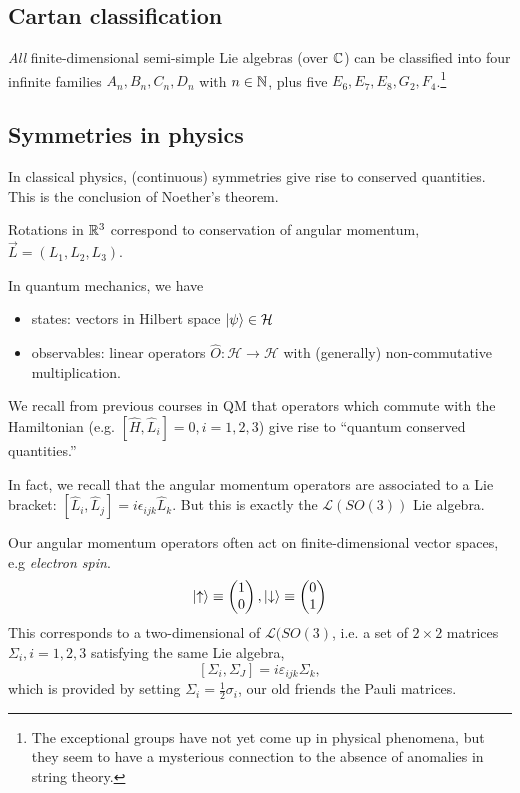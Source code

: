 \subsection*{Cartan classification}
\emph{All} finite-dimensional semi-simple Lie algebras (over $\mathbb{C}$) can be classified into four infinite families $A_n, B_n, C_n,D_n$ with $n\in \mathbb{N}$, plus five  $E_6,E_7,E_8,G_2,F_4$.\footnote{The exceptional groups have not yet come up in physical phenomena, but they seem to have a mysterious connection to the absence of anomalies in string theory.}

\subsection*{Symmetries in physics}
In classical physics, (continuous) symmetries give rise to conserved quantities. This is the conclusion of Noether's theorem.
\begin{exm}
Rotations in $\mathbb{R}^3$ correspond to conservation of angular momentum, $\vec{L}=(L_1,L_2,L_3)$.
\end{exm}
In quantum mechanics, we have
\begin{itemize}
    \item states: vectors in Hilbert space $\left| \psi \right>\in \mathcal{H}$
    \item observables: linear operators $\hat O: \mathcal{H}\to\mathcal{H}$ with (generally) non-commutative multiplication.
\end{itemize}
We recall from previous courses in QM that operators which commute with the Hamiltonian (e.g. $[\hat H, \hat L_i]=0, i= 1,2,3$) give rise to ``quantum conserved quantities.''

In fact, we recall that the angular momentum operators are associated to a Lie bracket: $[\hat L_i, \hat L_j]=i \epsilon_{ijk} \hat L_k$. But this is exactly the $\mathcal{L}(SO(3))$ Lie algebra. 

Our angular momentum operators often act on finite-dimensional vector spaces, e.g \emph{electron spin}.
$$\left| \uparrow \right>\equiv \begin{pmatrix}1\\0\end{pmatrix},\left| \downarrow \right>\equiv \begin{pmatrix}0\\1\end{pmatrix}$$
This corresponds to a two-dimensional  of $\mathcal{L}(SO(3)$, i.e. a set of $2\times 2$ matrices $\Sigma_i, i=1,2,3$ satisfying the same Lie algebra,
$$[\Sigma_i,\Sigma_J]=i\varepsilon_{ijk}\Sigma_k,$$
which is provided by setting $\Sigma_i=\frac{1}{2}\sigma_i$, our old friends the Pauli matrices.


